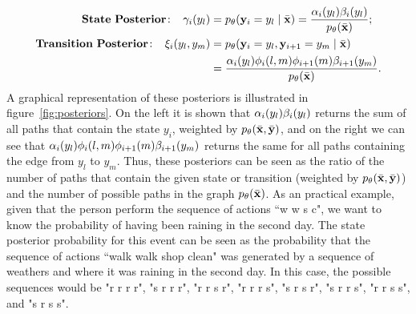 \begin{align}
 \mathbf{State \ Posterior\!:}\;\;\;\;   \gamma_i({y}_l) &= p_\theta(\mathbf{y}_i = {y}_l \mid \bar{\mathbf{x}}) = \frac{\alpha_i({y}_l) \beta_i({y}_l)}{p_{\theta}(\bar{\mathbf{x}})}; \label{eq::nodePosterior2} \\
 \mathbf{Transition \ Posterior\!:}\;\;\;\;  \xi_i({y}_l,{y}_m) &= p_\theta(\mathbf{y}_i = {y}_l, \mathbf{y}_{i+1}= {y}_m  \mid \bar{\mathbf{x}}) \nonumber\\
 &=  \frac{\alpha_i({y}_l) \phi_i(l,m)\phi_{i+1}(m)\beta_{i+1}({y}_m)}{p_{\theta}(\bar{\mathbf{x}})}.\label{eq::edgePosterior2}
\end{align}
A graphical representation of these posteriors is illustrated in figure~\ref{fig:posteriors}. 
On the left it is shown that $\alpha_i({y}_l) \beta_i({y}_l)$ returns the sum of all paths that contain the state $y_i$, weighted by $p_{\theta}(\bar{\mathbf{x}} ,\bar{\mathbf{y}})$, and on the right we can see that $\alpha_i({y}_l) \phi_i(l,m)\phi_{i+1}(m)\beta_{i+1}({y}_m)$ returns the same for all paths containing the edge from $y_l$ to $y_m$.
Thus, these posteriors can be seen as the ratio of the number of paths that contain the given state or transition (weighted by $p_{\theta}(\bar{\mathbf{x}} ,\bar{\mathbf{y}})$) and the number of possible paths in the graph $p_{\theta}(\bar{\mathbf{x}})$.
As an practical example, given that the person perform the sequence of actions ``w w s c", we want to know the probability of having been raining in the second day. The state posterior probability for this event can be seen as the probability that the sequence of actions ``walk walk shop clean" was generated by a sequence of weathers and where it was raining in the second day. In this case, the possible sequences would be "r r r r", "s r r r", "r r s r", "r r r s", "s r s r", "s r r s", "r r s s", and "s r s s".

